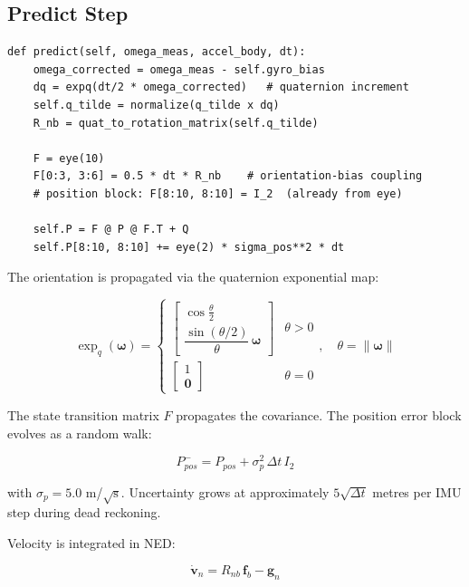 \documentclass[12pt,a4paper]{article}
\newcommand{\norm}[1]{\left\lVert#1\right\rVert}
\newcommand{\bv}{\mathbf{v}}
\newcommand{\bomega}{\boldsymbol{\omega}}
\begin{document}
\subsection{Predict Step}

\begin{lstlisting}[caption={EKF predict step (ekf\_ins.py:213--247).}]
def predict(self, omega_meas, accel_body, dt):
    omega_corrected = omega_meas - self.gyro_bias
    dq = expq(dt/2 * omega_corrected)   # quaternion increment
    self.q_tilde = normalize(q_tilde x dq)
    R_nb = quat_to_rotation_matrix(self.q_tilde)

    F = eye(10)
    F[0:3, 3:6] = 0.5 * dt * R_nb    # orientation-bias coupling
    # position block: F[8:10, 8:10] = I_2  (already from eye)

    self.P = F @ P @ F.T + Q
    self.P[8:10, 8:10] += eye(2) * sigma_pos**2 * dt
\end{lstlisting}

\noindent The orientation is propagated via the quaternion exponential map:

\begin{equation}
    \exp_q(\bomega) =
    \begin{cases}
        \begin{bmatrix} \cos\frac{\theta}{2} \\[4pt]
        \dfrac{\sin(\theta/2)}{\theta}\,\bomega \end{bmatrix} & \theta > 0 \\[10pt]
        \begin{bmatrix} 1 \\ \mathbf{0} \end{bmatrix} & \theta = 0
    \end{cases}, \quad \theta = \norm{\bomega}
    \label{eq:expq}
\end{equation}

The state transition matrix $F$ propagates the covariance. The position error
block evolves as a random walk:

\begin{equation}
    P_{pos}^- = P_{pos} + \sigma_p^2 \, \Delta t \, I_2
    \label{eq:pos_rw}
\end{equation}

with $\sigma_p = 5.0$ m/$\sqrt{\text{s}}$. Uncertainty grows at approximately
$5\sqrt{\Delta t}$ metres per IMU step during dead reckoning.

Velocity is integrated in NED:

\begin{equation}
    \dot{\bv}_n = R_{nb}\,\mathbf{f}_b - \mathbf{g}_n
    \label{eq:vel_int}
\end{equation}
\end{document}
